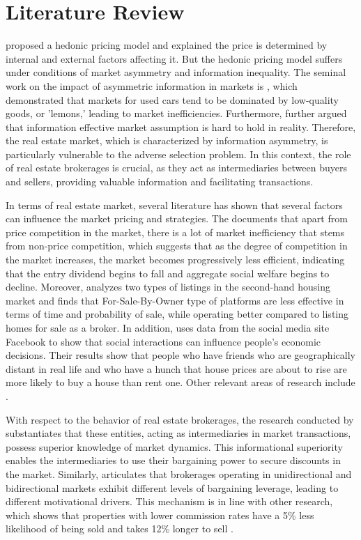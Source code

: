 \documentclass[12pt]{article}
\begin{document}
\section{Literature Review} \label{sec:literature_review}

\citet{Rosen_hedonic} proposed a hedonic pricing model and explained the price is determined by internal and external factors affecting it. But the hedonic pricing model suffers under conditions of market asymmetry and information inequality. The seminal work on the impact of asymmetric information in markets is \citep{Akerlof_1970}, which demonstrated that markets for used cars tend to be dominated by low-quality goods, or 'lemons,' leading to market inefficiencies.  Furthermore, \citet{grossman_impossibility_1980} further argued that information effective market assumption is hard to hold in reality. Therefore, the real estate market, which is characterized by information asymmetry, is particularly vulnerable to the adverse selection problem. In this context, the role of real estate brokerages is crucial, as they act as intermediaries between buyers and sellers, providing valuable information and facilitating transactions.

In terms of real estate market, several literature has shown that several factors can influence the market pricing and strategies. The \citep{550a6ccf-cde2-3dd1-979f-1a8db2b8ceb9} documents that apart from price competition in the market, there is a lot of market inefficiency that stems from non-price competition, which suggests that as the degree of competition in the market increases, the market becomes progressively less efficient, indicating that the entry dividend begins to fall and aggregate social welfare begins to decline. Moreover, \citet{hendel_relative_2009} analyzes two types of listings in the second-hand housing market and finds that For-Sale-By-Owner type of platforms are less effective in terms of time and probability of sale, while operating better compared to listing homes for sale as a broker. In addition, \citet{bailey_economic_2018} uses data from the social media site Facebook to show that social interactions can influence people's economic decisions. Their results show that people who have friends who are geographically distant in real life and who have a hunch that house prices are about to rise are more likely to buy a house than rent one. Other relevant areas of research include \citep{SIRMANS1991207, NIEUWERBURGH_information, salz_intermediation_2022}.

With respect to the behavior of real estate brokerages, the research conducted by \citep{AGARWAL2019715} substantiates that these entities, acting as intermediaries in market transactions, possess superior knowledge of market dynamics. This informational superiority enables the intermediaries to use their bargaining power to secure discounts in the market. Similarly, \citet{HAN2015813} articulates that brokerages operating in unidirectional and bidirectional markets exhibit different levels of bargaining leverage, leading to different motivational drivers. This mechanism is in line with other research, which shows that properties with lower commission rates have a 5\% less likelihood of being sold and takes 12\% longer to sell \citep{10.1257/app.20160214}.
\end{document}
